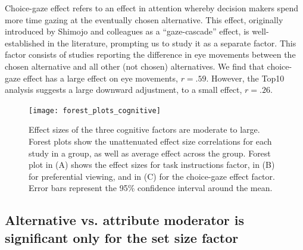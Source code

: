 Choice-gaze effect refers to an effect in attention whereby decision makers spend more time gazing at the eventually chosen alternative. This effect, originally introduced by Shimojo and colleagues \citep{shimojo2003a} as a ``gaze-cascade'' effect, is well-established in the literature, prompting us to study it as a separate factor. This factor consists of studies reporting the difference in eye movements between the chosen alternative and all other (not chosen) alternatives. We find that choice-gaze effect has a large effect on eye movements, $r=.59$. However, the Top10 analysis suggests a large downward adjustment, to a small effect, $r=.26$.


\begin{figure}[!h]
\texttt{[image: forest\_plots\_cognitive]}
\centering
\caption{Effect sizes of the three cognitive factors are moderate to large. Forest plots show the unattenuated effect size correlations for each study in a group, as well as average effect across the group. Forest plot in (A) shows the effect sizes for task instructions factor, in (B) for preferential viewing, and in (C) for the choice-gaze effect factor. Error bars represent the 95\% confidence interval around the mean.}
\label{fig:forest_plots_cognitive}
\end{figure}


\subsection{Alternative vs. attribute moderator is significant only for the set size factor}

